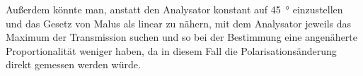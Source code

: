 \documentclass[
	a4paper,
	12pt,
	pagesize,
	ngerman
]{scrartcl}
\begin{document}
	Außerdem könnte man, anstatt den Analysator konstant auf \SI{45}{\degree} einzustellen und das Gesetz von Malus als linear zu nähern, mit dem Analysator jeweils das Maximum der Transmission suchen und so bei der Bestimmung eine angenäherte Proportionalität weniger haben, da in diesem Fall die Polarisationsänderung direkt gemessen werden würde. %
\end{document}
